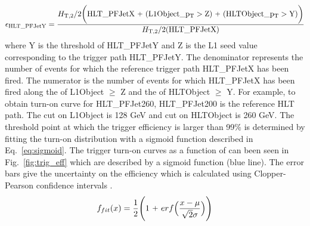 \begin{equation}
 \label{eq:eff}
 {\rm \epsilon_{HLT\_PFJetY}} = \frac{\httwo {\rm \bigg(HLT\_PFJetX~\plus (L1Object\_\pt > Z)~\plus (HLTObject\_\pt > Y)\bigg)}}{\httwo {\rm (HLT\_PFJetX)}}
\end{equation}
where Y is the \pt threshold of HLT\_PFJetY and Z is the L1 seed value corresponding to the trigger path HLT\_PFJetY. The denominator represents the number of events for which the reference trigger path HLT\_PFJetX has been fired. The numerator is the number of events for which HLT\_PFJetX has been fired along the \pt of L1Object $\geq$ Z and the \pt of HLTObject $\geq$ Y. For example, to obtain turn-on curve for HLT\_PFJet260, HLT\_PFJet200 is the reference HLT path. The \pt cut on L1Object is 128 GeV and \pt cut on HLTObject is 260 GeV. The threshold point at which the trigger efficiency is larger than 99\% is determined by fitting the turn-on distribution with a sigmoid function described in Eq.~\ref{eq:sigmoid}. The trigger turn-on curves as a function of \httwo can been seen in Fig.~\ref{fig:trig_eff} which are described by a sigmoid function (blue line). The error bars give the uncertainty on the efficiency which is calculated using Clopper-Pearson confidence intervals \cite{10.2307/2331986}.
\begin{equation}
 \label{eq:sigmoid}
  f_{fit} (x) = \frac {1}{2} \Bigg( 1 ~\plusn~ erf \Big(\frac {x - \mu}{\sqrt{2} \sigma} \Big) \Bigg)
\end{equation}


